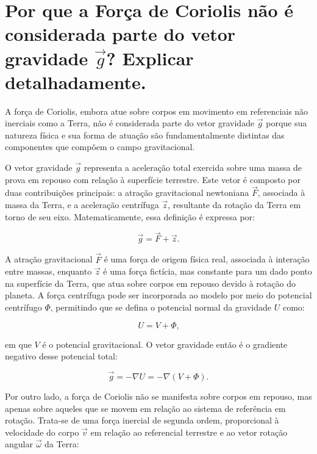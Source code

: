 
\section{Por que a Força de Coriolis não é considerada parte do vetor gravidade $\vec{g}$? Explicar detalhadamente.}

A força de Coriolis, embora atue sobre corpos em movimento em referenciais não inerciais como a Terra, não é considerada parte do vetor gravidade \( \vec{g} \) porque sua natureza física e sua forma de atuação são fundamentalmente distintas das componentes que compõem o campo gravitacional.

O vetor gravidade \( \vec{g} \) representa a aceleração total exercida sobre uma massa de prova em repouso com relação à superfície terrestre. Este vetor é composto por duas contribuições principais: a atração gravitacional newtoniana \( \vec{F} \), associada à massa da Terra, e a aceleração centrífuga \( \vec{z} \), resultante da rotação da Terra em torno de seu eixo. Matematicamente, essa definição é expressa por:

\[
\vec{g} = \vec{F} + \vec{z} \text{.}
\]

A atração gravitacional \( \vec{F} \) é uma força de origem física real, associada à interação entre massas, enquanto \( \vec{z} \) é uma força fictícia, mas constante para um dado ponto na superfície da Terra, que atua sobre corpos em repouso devido à rotação do planeta. A força centrífuga pode ser incorporada ao modelo por meio do potencial centrífugo \( \Phi \), permitindo que se defina o potencial normal da gravidade \( U \) como:

\[
U = V + \Phi \text{,}
\]

\noindent
em que \( V \) é o potencial gravitacional. O vetor gravidade então é o gradiente negativo desse potencial total:

\[
\vec{g} = -\nabla U = -\nabla(V + \Phi) \text{.}
\]

Por outro lado, a força de Coriolis não se manifesta sobre corpos em repouso, mas apenas sobre aqueles que se movem em relação ao sistema de referência em rotação. Trata-se de uma força inercial de segunda ordem, proporcional à velocidade do corpo \( \vec{v} \) em relação ao referencial terrestre e ao vetor rotação angular \( \vec{\omega} \) da Terra:

